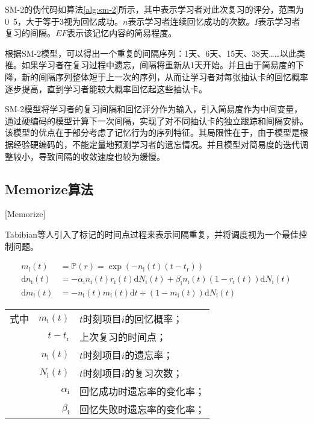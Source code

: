 SM-2的伪代码如算法\ref{alg:sm-2}所示，其中表示学习者对此次复习的评分，范围为0~5，大于等于3视为回忆成功。$n$表示学习者连续回忆成功的次数。$I$表示学习者复习的间隔。$EF$表示该记忆内容的简易程度。

根据SM-2模型，可以得出一个重复的间隔序列：1天、6天、15天、38天……以此类推。如果学习者在复习过程中遗忘，间隔将重新从1天开始。并且由于简易度的下降，新的间隔序列整体短于上一次的序列，从而让学习者对每张抽认卡的回忆概率逐步提高，直到学习者能较大概率回忆起这些抽认卡。

SM-2模型将学习者的复习间隔和回忆评分作为输入，引入简易度作为中间变量，通过硬编码的模型计算下一次间隔，实现了对不同抽认卡的独立跟踪和间隔安排。该模型的优点在于部分考虑了记忆行为的序列特征。其局限性在于，由于模型是根据经验硬编码的，不能定量地预测学习者的遗忘情况。并且模型对简易度的迭代调整较小，导致间隔的收敛速度也较为缓慢。

\subsection{Memorize算法}[Memorize]

Tabibian等人\cite{tabibianEnhancingHumanLearning2019}引入了标记的时间点过程来表示间隔重复，并将调度视为一个最佳控制问题。

\begin{equation}
\begin{aligned}
    m_\mathrm{i}(t)&=\mathbb{P}(r)=\exp (-n_\mathrm{i}(t)(t-t_\mathrm{r}))\\
    \mathrm{d} n_\mathrm{i}(t)&=-\alpha_\mathrm{i} n_\mathrm{i}(t) r_\mathrm{i}(t) \mathrm{d} N_\mathrm{i}(t)+\beta_\mathrm{i} n_\mathrm{i}(t)(1-r_\mathrm{i}(t)) \mathrm{d} N_\mathrm{i}(t)\\
    \mathrm{d} m_\mathrm{i}(t)&=-n_\mathrm{i}(t) m_\mathrm{i}(t) \mathrm{d} t+(1-m_\mathrm{i}(t)) \mathrm{d} N_\mathrm{i}(t)
\end{aligned}
\end{equation}
\begin{tabularx}{\textwidth}{@{}l@{\quad}r@{———}X@{}}
    式中& $m_\mathrm{i}(t)$ &$t$时刻项目$i$的回忆概率；\\
    & $t-t_\mathrm{r}$ &上次复习的时间点；\\
    & $n_\mathrm{i}(t)$ &$t$时刻项目$i$的遗忘率；\\
    & $N_\mathrm{i}(t)$ &$t$时刻项目$i$的复习次数；\\
    & $\alpha_\mathrm{i}$ &回忆成功时遗忘率的变化率；\\
    & $\beta_\mathrm{i}$ &回忆失败时遗忘率的变化率；\\
\end{tabularx}\vspace{3.15bp}

